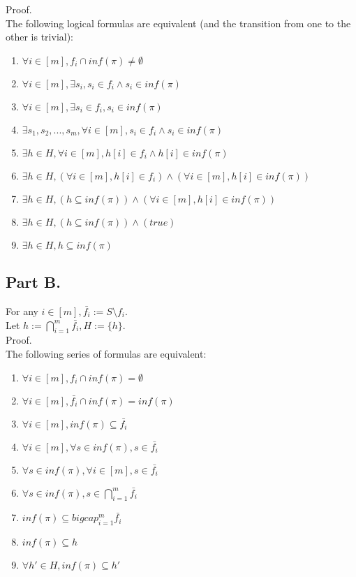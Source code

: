 \documentclass{article}
\begin{document}
Proof.\\
The following logical formulas are equivalent (and the transition from one to the other is trivial):
\begin{enumerate}
    \item $\forall i\in[m], f_i\cap inf(\pi)\neq\emptyset$
    \item $\forall i\in[m],\exists s_i, s_i\in f_i\wedge s_i\in inf(\pi)$
    \item $\forall i\in[m],\exists s_i\in f_i, s_i\in inf(\pi)$
    \item $\exists s_1,s_2,...,s_m,\forall i\in[m], s_i\in f_i\wedge s_i\in inf(\pi)$
    \item $\exists h\in H,\forall i\in[m], h[i]\in f_i\wedge h[i]\in inf(\pi)$
    \item $\exists h\in H,(\forall i\in[m], h[i]\in f_i)\wedge (\forall i\in[m], h[i]\in inf(\pi))$
    \item $\exists h\in H,(h\subseteq inf(\pi))\wedge (\forall i\in[m], h[i]\in inf(\pi))$
    \item $\exists h\in H,(h\subseteq inf(\pi))\wedge (true)$
    \item $\exists h\in H, h\subseteq inf(\pi)$
\end{enumerate}

\subsection*{Part B.}
For any $i\in[m], \bar{f_i}:=S\setminus f_i$.\\
Let $h:=\bigcap_{i=1}^m\bar{f_i}, H:=\{h\}$.\\

Proof.\\
The following series of formulas are equivalent:
\begin{enumerate}
    \item $\forall i\in[m], f_i\cap inf(\pi)=\emptyset$
    \item $\forall i\in[m], \bar{f_i}\cap inf(\pi)=inf(\pi)$
    \item $\forall i\in[m], inf(\pi)\subseteq \bar{f_i}$
    \item $\forall i\in[m], \forall s\in inf(\pi),s\in\bar{f_i}$
    \item $\forall s\in inf(\pi), \forall i\in[m],s\in\bar{f_i}$
    \item $\forall s\in inf(\pi), s\in\bigcap_{i=1}^m\bar{f_i}$
    \item $inf(\pi)\subseteq bigcap_{i=1}^m\bar{f_i}$
    \item $inf(\pi)\subseteq h$
    \item $\forall h'\in H, inf(\pi)\subseteq h'$
\end{enumerate}
\end{document}
